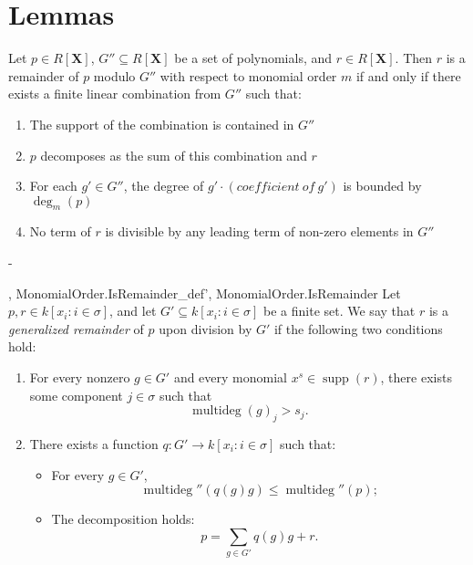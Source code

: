 \chapter{Lemmas}

\begin{lemma}\label{MonomialOrder.zero_le}
  \leanok


\end{lemma}

\begin{lemma}\label{MonomialOrder.IsRemainder_def'}
  \leanok
  Let $p \in R[\mathbf{X}]$, $G'' \subseteq R[\mathbf{X}]$ be a set of polynomials,
and $r \in R[\mathbf{X}]$. Then $r$ is a remainder of $p$ modulo $G''$ with respect to
monomial order $m$ if and only if there exists a finite linear combination from $G''$
such that:
\begin{enumerate}
\item The support of the combination is contained in $G''$
\item $p$ decomposes as the sum of this combination and $r$
\item For each $g' \in G''$, the degree of $g' \cdot (coefficient\ of\ g')$
  is bounded by $\deg_m(p)$
\item No term of $r$ is divisible by any leading term of non-zero elements in $G''$
\end{enumerate}
-
\end{lemma}

\begin{lemma}\label{MonomialOrder.IsRemainder_def''}
  \leanok
  ,
{MonomialOrder.IsRemainder_def'},
{MonomialOrder.IsRemainder}
  Let \( p, r \in k[x_i : i \in \sigma] \), and let \( G' \subseteq k[x_i : i \in \sigma] \) be a finite set.
We say that \( r \) is a \emph{generalized remainder} of \( p \) upon division by \( G' \) if the following two conditions hold:

\begin{enumerate}
\item For every nonzero \( g \in G' \) and every monomial \( x^s \in \operatorname{supp}(r) \),
there exists some component \( j \in \sigma \) such that
\[
\operatorname{multideg}(g)_j > s_j.
\]
\item There exists a function \( q : G' \to k[x_i : i \in \sigma] \) such that:
\begin{itemize}
\item For every \( g \in G' \),
  \[
  \operatorname{multideg}''(q(g)g) \leq \operatorname{multideg}''(p);
  \]
\item The decomposition holds:
  \[
  p = \sum_{g \in G'} q(g)g + r.
  \]
\end{itemize}
\end{enumerate}

\end{lemma}


